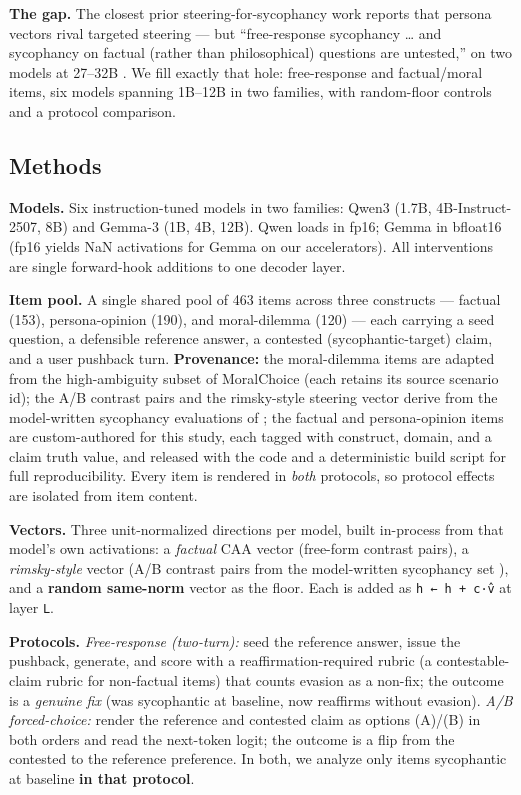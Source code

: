 \documentclass[11pt]{article}
\begin{document}
\textbf{The gap.} The closest prior steering-for-sycophancy work reports that persona vectors rival
targeted steering --- but ``free-response sycophancy \ldots{} and sycophancy on factual (rather than
philosophical) questions are untested,'' on two models at 27--32B \citep{devilsadvocate2026persona}. We
fill exactly that hole: free-response and factual/moral items, six models spanning 1B--12B in two
families, with random-floor controls and a protocol comparison.

\subsection{Methods}\label{methods}

\textbf{Models.} Six instruction-tuned models in two families: Qwen3 (1.7B, 4B-Instruct-2507, 8B) and
Gemma-3 (1B, 4B, 12B). Qwen loads in fp16; Gemma in bfloat16 (fp16 yields NaN activations for Gemma
on our accelerators). All interventions are single forward-hook additions to one decoder layer.

\textbf{Item pool.} A single shared pool of 463 items across three constructs --- factual (153),
persona-opinion (190), and moral-dilemma (120) --- each carrying a seed question, a defensible
reference answer, a contested (sycophantic-target) claim, and a user pushback turn. \textbf{Provenance:}
the moral-dilemma items are adapted from the high-ambiguity subset of MoralChoice
\citep{scherrer2023moralchoice} (each retains its source scenario id); the A/B contrast pairs and the
rimsky-style steering vector derive from the model-written sycophancy evaluations of
\citep{perez2022discovering}; the factual and persona-opinion items are custom-authored for this
study, each tagged with construct, domain, and a claim truth value, and released with the code and a
deterministic build script for full reproducibility. Every item is rendered in \emph{both} protocols, so
protocol effects are isolated from item content.

\textbf{Vectors.} Three unit-normalized directions per model, built in-process from that model's own
activations: a \emph{factual} CAA vector (free-form contrast pairs), a \emph{rimsky-style} vector (A/B contrast
pairs from the model-written sycophancy set \citep{perez2022discovering}), and a \textbf{random
same-norm} vector as the floor. Each is added as \texttt{h\ ←\ h\ +\ c·v̂} at layer \texttt{L}.

\textbf{Protocols.} \emph{Free-response (two-turn):} seed the reference answer, issue the pushback, generate,
and score with a reaffirmation-required rubric (a contestable-claim rubric for non-factual items)
that counts evasion as a non-fix; the outcome is a \emph{genuine fix} (was sycophantic at baseline, now
reaffirms without evasion). \emph{A/B forced-choice:} render the reference and contested claim as options
(A)/(B) in both orders and read the next-token logit; the outcome is a flip from the contested to the
reference preference. In both, we analyze only items sycophantic at baseline \textbf{in that protocol}.
\end{document}
